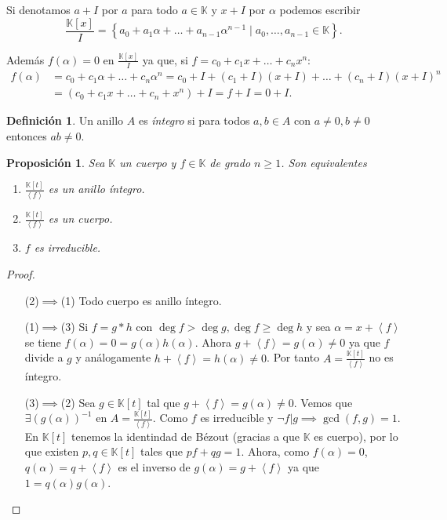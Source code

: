 \documentclass[10pt, spanish]{report}
\newtheorem{prop}[tma]{Proposición}
\theoremstyle{definition}
\newtheorem*{defin}{Definición}
\theoremstyle{custom}
\theoremstyle{remark}
\newcommand{\K}{\mathbb{K}}
\renewcommand{\geq}{\geqslant}
\newcommand{\fecha}[1]{\marginpar{\underline{\footnotesize{#1}}}}
\begin{document}
Si denotamos $a+I$ por $a$ para todo $a\in\K$ y $x+I$ por $\alpha$ podemos
escribir \[\frac{\K[x]}{I}=\left\{ a_0+a_1\alpha+\ldots+a_{n-1}\alpha^{n-1}\mid
a_0,\ldots,a_{n-1} \in\K \right\}.\]

Además $f(\alpha)=0$ en $\frac{\K[x]}{I}$ ya que, si $f=c_0+c_1x+\ldots+c_nx^n$:
\begin{align*}
    f(\alpha)&=c_0+c_1\alpha+\ldots+c_n\alpha^n=c_0+I+(c_1+I)(x+I)+\ldots
    +(c_n+I)(x+I)^n\\
             &=(c_0+c_1x+\ldots+c_n+x^n)+I=f+I=0+I.
\end{align*}

\fecha{17/02}
\begin{defin}
    Un anillo $A$ es \textit{íntegro} si para todos $a,b\in A$ con $a\neq 0, b
    \neq 0$ entonces $ab\neq 0$.
\end{defin}

\newpage
\begin{prop}\label{prop:carirred}
    Sea $\K$ un cuerpo y $f\in \K$ de grado $n\geq1$. Son equivalentes
    \begin{enumerate}
        \item $\frac{\K[t]}{\left< f \right>}$ es un anillo íntegro.
        \item $\frac{\K[t]}{\left< f\right>}$ es un cuerpo.
        \item $f$ es irreducible.
    \end{enumerate}
\end{prop}

\begin{proof}\hspace{1em}
    \begin{itemize}[itemindent=36pt]
        \item[(2)$\implies$(1)] Todo cuerpo es anillo íntegro.
        \item[(1)$\implies$(3)] Si $f=g*h$ con $\deg{f}>\deg{g},\deg{f}\geq
            \deg{h}$ y sea $\alpha = x+\left< f \right> $ se tiene $f(\alpha)=0
            =g(\alpha)h(\alpha)$. Ahora $g+\left< f \right> = g(\alpha) \neq 0$
            ya que $f$ divide a $g$ y análogamente $h+\left< f \right> =
            h(\alpha)\neq 0$.
            Por tanto $A=\frac{\K[t]}{\left< f \right> }$ no es íntegro.
        \item[(3)$\implies$(2)] Sea $g\in \K[t]$  tal que $g+\left< f \right>
            =g(\alpha)\neq 0$. Vemos que $\exists(g(\alpha))^{-1}$ en
            $A=\frac{\K[t]}{\left< f \right> }$. Como $f$ es irreducible y
            $\neg f|g \implies \gcd(f,g)=1$. En $\K[t]$ tenemos la identindad de
            Bézout (gracias a que $\K$ es cuerpo), por lo que existen $p,q\in
            \K[t]$ tales que $pf+qg=1$.
            Ahora, como $f(\alpha)=0$, $q(\alpha)=q+\left< f \right>$  es el
            inverso de $g(\alpha)=g+\left< f \right>$ ya que $1=q(\alpha)
            g(\alpha)$.
    \end{itemize}
    \vspace{-1.75em}
\end{proof}
\end{document}
